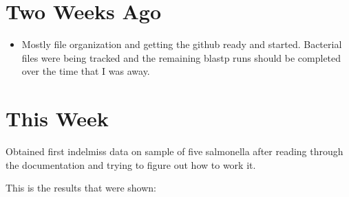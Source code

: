 \documentclass[12pt]{article}
\begin{document}
\bigskip	
	
\section*{Two Weeks Ago}

\begin{itemize} 

\item Mostly file organization and getting the github ready and started. Bacterial 
files were being tracked and the remaining blastp runs should be completed over the
time that I was away. 

\end{itemize}

\section*{This Week}
Obtained first indelmiss data on sample of five salmonella after reading through the 
documentation and trying to figure out how to work it.

This is the results that were shown:
\end{document}
